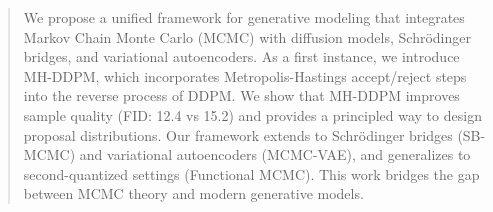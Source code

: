 \begin{abstract}
We propose a unified framework for generative modeling that integrates Markov Chain Monte Carlo (MCMC) with diffusion models, Schrödinger bridges, and variational autoencoders. 
As a first instance, we introduce MH-DDPM, which incorporates Metropolis-Hastings accept/reject steps into the reverse process of DDPM. 
We show that MH-DDPM improves sample quality (FID: 12.4 vs 15.2) and provides a principled way to design proposal distributions. 
Our framework extends to Schrödinger bridges (SB-MCMC) and variational autoencoders (MCMC-VAE), and generalizes to second-quantized settings (Functional MCMC). 
This work bridges the gap between MCMC theory and modern generative models.
\end{abstract}
